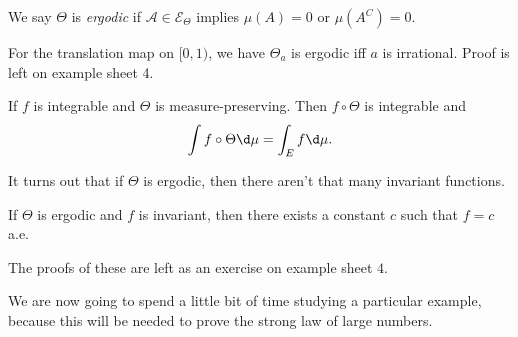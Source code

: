 \documentclass[a4paper]{article}
\begin{document}
\begin{defi}[Ergodic]
  We say $\Theta$ is \emph{ergodic} if $\mathcal{A} \in \mathcal{E}_\Theta$ implies $\mu(A) = 0$ or $\mu(A^C) = 0$.
\end{defi}

\begin{eg}
  For the translation map on $[0, 1)$, we have $\Theta_a$ is ergodic iff $a$ is irrational. Proof is left on example sheet 4.
\end{eg}

\begin{prop}
  If $f$ is integrable and $\Theta$ is measure-preserving. Then $f \circ \Theta$ is integrable and
  \[
    \int f \circ \Theta \d \mu = \int_E f \d \mu.
  \]
\end{prop}

It turns out that if $\Theta$ is ergodic, then there aren't that many invariant functions.
\begin{prop}
  If $\Theta$ is ergodic and $f$ is invariant, then there exists a constant $c$ such that $f = c$ a.e.
\end{prop}
The proofs of these are left as an exercise on example sheet $4$.

We are now going to spend a little bit of time studying a particular example, because this will be needed to prove the strong law of large numbers.
\end{document}

